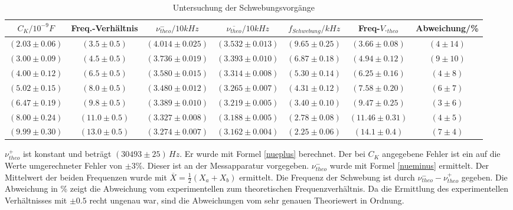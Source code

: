 \documentclass[11pt,ngerman,a4paper]{article}
\begin{document}
\begin{table}[h]
\hspace{-2.6cm}
\begin{tabular}{|c|c|c|c|c|c|c|}
\hline
$C_K / 10^{-9}F$ & Freq.-Verhältnis & $\nu_{theo}^-/10kHz$ & $\overline{\nu_{theo}}/10kHz$ & $f_{Schwebung}/kHz$ & Freq-$V._{theo}$ & Abweichung/\% \\
\hline
$(2.03\pm0.06)$& $(3.5\pm0.5)$ & $(4.014\pm0.025)$& $(3.532\pm0.013)$& $(9.65\pm0.25)$& $(3.66\pm0.08)$ & $(4\pm14)$\\
$(3.00\pm0.09)$& $(4.5\pm0.5)$ & $(3.736\pm0.019)$& $(3.393\pm0.010)$& $(6.87\pm0.18)$& $(4.94\pm0.12)$ & $(9\pm10)$\\
$(4.00\pm0.12)$& $(6.5\pm0.5)$ & $(3.580\pm0.015)$& $(3.314\pm0.008)$& $(5.30\pm0.14)$& $(6.25\pm0.16)$ & $(4\pm8)$\\
$(5.02\pm0.15)$& $(8.0\pm0.5)$ & $(3.480\pm0.012)$& $(3.265\pm0.007)$& $(4.31\pm0.12)$& $(7.58\pm0.20)$ & $(6\pm7)$\\
$(6.47\pm0.19)$& $(9.8\pm0.5)$ & $(3.389\pm0.010)$& $(3.219\pm0.005)$& $(3.40\pm0.10)$& $(9.47\pm0.25)$ & $(3\pm6)$\\
$(8.00\pm0.24)$& $(11.0\pm0.5)$ & $(3.327\pm0.008)$& $(3.188\pm0.005)$& $(2.78\pm0.08)$& $(11.46\pm0.31)$ & $(4\pm5)$\\
$(9.99\pm0.30)$& $(13.0\pm0.5)$ & $(3.274\pm0.007)$& $(3.162\pm0.004)$& $(2.25\pm0.06)$& $(14.1\pm0.4)$ & $(7\pm4)$\\
\hline
\end{tabular}
\caption{Untersuchung der Schwebungsvorgänge}
\label{AufgabeA}
\end{table}\noindent
$\nu_{theo}^+$ ist konstant und beträgt $(30493\pm25)\,Hz$. Er wurde mit Formel \ref{nueplus} berechnet. Der bei $C_K$ angegebene Fehler ist ein auf die Werte umgerechneter Fehler von $\pm 3 \%$. Dieser ist an der Messapparatur vorgegeben. $\nu_{theo}^-$ wurde mit Formel \ref{nueminus} ermittelt. Der Mittelwert der beiden Frequenzen wurde mit $\overline{X}=\frac{1}{2}(X_a+X_b)$ ermittelt. Die Frequenz der Schwebung ist durch $\nu_{theo}^--\nu_{theo}^+$ gegeben. Die Abweichung in \% zeigt die Abweichung vom experimentellen zum theoretischen Frequenzverhältnis. Da die Ermittlung des experimentellen Verhältnisses mit $\pm0.5$ recht ungenau war, sind die Abweichungen vom sehr genauen Theoriewert in Ordnung.
\end{document}
